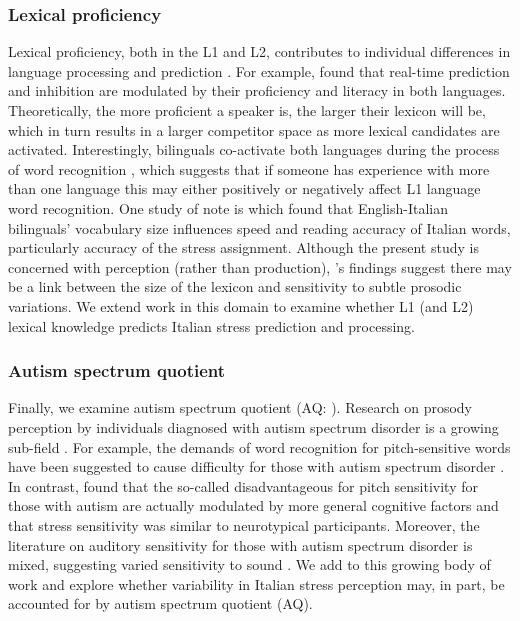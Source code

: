 \subsubsection{Lexical proficiency}
Lexical proficiency, both in the L1 and L2, contributes to individual differences in language processing and prediction \citep{Diependaele2013, Yap2012}. For example, \citep{Kukona2016} found that real-time prediction and inhibition are modulated by their proficiency and literacy in both languages. Theoretically, the more proficient a speaker is, the larger their lexicon will be, which in turn results in a larger competitor space as more lexical candidates are activated. Interestingly, bilinguals co-activate both languages during the process of word recognition \citep{kroll1997lexical, dijkstra2002architecture, marian2003competing}, which suggests that if someone has experience with more than one language this may either positively or negatively affect L1 language word recognition. One study of note is \cite{primativo2013bilingual} which found that English-Italian bilinguals' vocabulary size influences speed and reading accuracy of Italian words, particularly accuracy of the stress assignment. Although the present study is concerned with perception (rather than production), \cite{primativo2013bilingual}'s findings suggest there may be a link between the size of the lexicon and sensitivity to subtle prosodic variations. We extend work in this domain to examine whether L1 (and L2) lexical knowledge predicts Italian stress prediction and processing.

\subsubsection{Autism spectrum quotient}
Finally, we examine autism spectrum quotient (AQ: \cite{Baron-Cohen2001}). Research on prosody perception by individuals diagnosed with autism spectrum disorder is a growing sub-field \citep[see ][]{Grice2023, Paul2005, McCann2003}. For example, the demands of word recognition for pitch-sensitive words have been suggested to cause difficulty for those with autism spectrum disorder \citep{schelinski2020speech}. In contrast, \cite{grossman2023relationship} found that the so-called disadvantageous for pitch sensitivity for those with autism are actually modulated by more general cognitive factors and that stress sensitivity was similar to neurotypical participants. Moreover, the literature on auditory sensitivity for those with autism spectrum disorder is mixed, suggesting varied sensitivity to sound \citep{Kuiper2019, Stiegler2010}. We add to this growing body of work and explore whether variability in Italian stress perception may, in part, be accounted for by autism spectrum quotient (AQ). 

